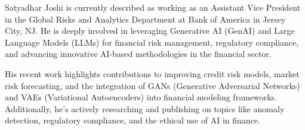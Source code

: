 \documentclass[a4paper,headinclude=on,footinclude=on,12pt,oneside]{scrbook}
\begin{document}
Satyadhar Joshi is currently described as working as an Assistant Vice President in the Global Risks and Analytics Department at Bank of America in Jersey City, NJ. He is deeply involved in leveraging Generative AI (GenAI) and Large Language Models (LLMs) for financial risk management, regulatory compliance, and advancing innovative AI-based methodologies in the financial sector.

His recent work highlights contributions to improving credit risk models, market risk forecasting, and the integration of GANs (Generative Adversarial Networks) and VAEs (Variational Autoencoders) into financial modeling frameworks. Additionally, he's actively researching and publishing on topics like anomaly detection, regulatory compliance, and the ethical use of AI in finance.
\end{document}
